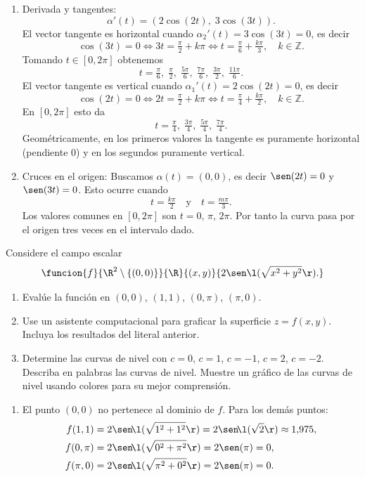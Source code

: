 \documentclass[11pt,respuestas,a4]{aleph-examen}
\begin{document}
\begin{preguntas}
\begin{respuesta}
\begin{enumerate}
    \item Derivada y tangentes:
    \[\alpha'(t)=(2\cos(2t),\;3\cos(3t)).\]
    El vector tangente es horizontal cuando $\alpha_2'(t)=3\cos(3t)=0$, es decir
    \[\cos(3t)=0\iff 3t=\tfrac{\pi}{2}+k\pi\iff t=\tfrac{\pi}{6}+\tfrac{k\pi}{3},\quad k\in\mathbb{Z}.
    \]
    Tomando $t\in[0,2\pi]$ obtenemos
    \[t=\tfrac{\pi}{6},\;\tfrac{\pi}{2},\;\tfrac{5\pi}{6},\;\tfrac{7\pi}{6},\;\tfrac{3\pi}{2},\;\tfrac{11\pi}{6}.
    \]
    El vector tangente es vertical cuando $\alpha_1'(t)=2\cos(2t)=0$, es decir
    \[\cos(2t)=0\iff 2t=\tfrac{\pi}{2}+k\pi\iff t=\tfrac{\pi}{4}+\tfrac{k\pi}{2},\quad k\in\mathbb{Z}.
    \]
    En $[0,2\pi]$ esto da
    \[t=\tfrac{\pi}{4},\;\tfrac{3\pi}{4},\;\tfrac{5\pi}{4},\;\tfrac{7\pi}{4}.
    \]
    Geométricamente, en los primeros valores la tangente es puramente horizontal (pendiente 0) y en los segundos puramente vertical.

    \item Cruces en el origen:
    Buscamos $\alpha(t)=(0,0)$, es decir $\sen(2t)=0$ y $\sen(3t)=0$. Esto ocurre cuando
    \[t=\tfrac{k\pi}{2}\quad\text{y}\quad t=\tfrac{m\pi}{3}.
    \]
    Los valores comunes en $[0,2\pi]$ son $t=0,\,\pi,\,2\pi$. Por tanto la curva pasa por el origen tres veces en el intervalo dado.\qedhere
\end{enumerate}
\end{respuesta}

\item
Considere el campo escalar
\[
    \funcion{f}{\R^2\setminus\{(0,0)\}}{\R}{(x,y)}{2\sen\l(\sqrt{x^2+y^2}\r).}
\]
\begin{enumerate}
    \item Evalúe la función en $(0,0)$, $(1,1)$, $(0,\pi)$, $(\pi,0)$. 
    \item Use un asistente computacional para graficar la superficie $z=f(x,y)$. Incluya los resultados del literal anterior.
    \item Determine las curvas de nivel con $c=0$, $c=1$, $c=-1$, $c=2$, $c=-2$. Describa en palabras las curvas de nivel. Muestre un gráfico de las curvas de nivel usando colores para su mejor comprensión.
\end{enumerate}

\begin{respuesta}\hspace{0pt}
\begin{enumerate}
    \item El punto $(0,0)$ no pertenece al dominio de $f$. Para los demás puntos:
    \begin{align*}
        f(1,1)   &= 2\sen\!\l(\sqrt{1^2+1^2}\r) = 2\sen\!\l(\sqrt{2}\r) \approx 1{,}975,\\
        f(0,\pi) &= 2\sen\!\l(\sqrt{0^2+\pi^2}\r) = 2\sen(\pi) = 0,\\
        f(\pi,0) &= 2\sen\!\l(\sqrt{\pi^2+0^2}\r) = 2\sen(\pi) = 0.
    \end{align*}


\end{enumerate}
\end{respuesta}
\end{preguntas}
\end{document}
